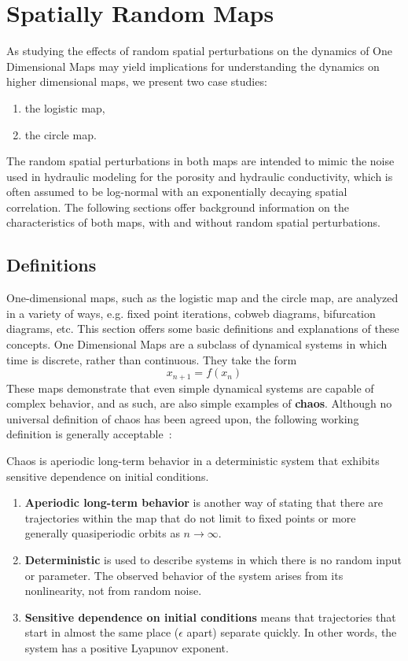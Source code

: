 \chapter{Spatially Random Maps}
\label{background}
As studying the effects of random spatial perturbations
on the dynamics of One Dimensional Maps may yield implications for
understanding the dynamics on higher dimensional maps, we present two
case studies:
\begin{enumerate}
\item the logistic map,
\item the circle map.
\end{enumerate}
The random spatial perturbations in both maps are intended to mimic
the noise used in hydraulic modeling for the porosity and hydraulic
conductivity, which is often assumed to be log-normal with an
exponentially decaying spatial correlation. The following sections
offer background information on the characteristics of both maps, with
and without random spatial perturbations. 
\section{Definitions}
One-dimensional maps, such as the logistic map and the circle map, are
analyzed in a variety of ways, e.g. fixed point iterations,
cobweb diagrams, bifurcation diagrams, etc. This section offers some
basic definitions and explanations of these concepts. One Dimensional Maps are a
subclass of dynamical systems in which time is discrete, rather than
continuous. They take the form
\begin{equation*}
x_{n+1}=f(x_n)
\end{equation*}
These maps demonstrate that even simple dynamical systems are capable
of complex behavior, and as such, are also simple examples of
\textbf{chaos}. Although no universal definition of chaos has been
agreed upon, the following working definition is generally acceptable~\cite{strogatz}:
\begin{singlespace}
\begin{definition}
Chaos is aperiodic long-term behavior in a deterministic
  system that exhibits sensitive dependence on initial conditions.
\end{definition}
\end{singlespace}
\begin{enumerate}
\item \textbf{Aperiodic long-term behavior} is another way of stating
  that there are trajectories within the map that do not limit to
  fixed points or more generally quasiperiodic orbits as $n \to \infty$.
\item \textbf{Deterministic} is used to describe systems in which
  there is no random input or parameter. The observed behavior of the
  system arises from its nonlinearity, not from random noise.
\item \textbf{Sensitive dependence on initial conditions} means that
  trajectories that start in almost the same place ($\epsilon$ apart)
  separate quickly. In other words, the system has a
  positive Lyapunov exponent.
\end{enumerate}

